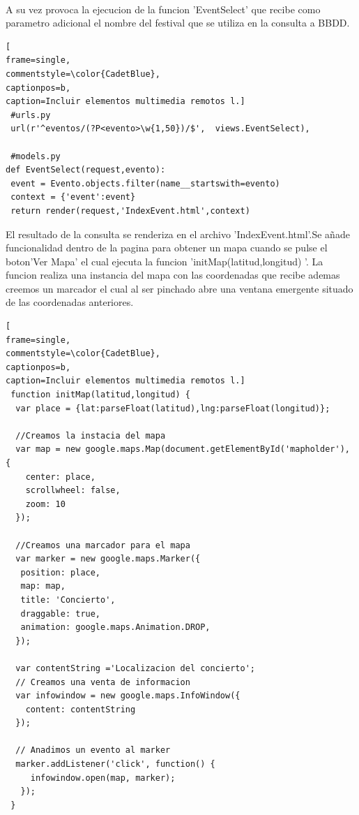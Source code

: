 \\A su vez provoca la ejecucion de la funcion 'EventSelect' que recibe como parametro adicional el nombre del festival que se utiliza en la consulta a BBDD.
\lstset{language=, breaklines=true, basicstyle=\footnotesize}
\begin{lstlisting}[
frame=single,
commentstyle=\color{CadetBlue},
captionpos=b,
caption=Incluir elementos multimedia remotos l.]
 #urls.py
 url(r'^eventos/(?P<evento>\w{1,50})/$',  views.EventSelect),
 
 #models.py
def EventSelect(request,evento):
 event = Evento.objects.filter(name__startswith=evento)
 context = {'event':event}
 return render(request,'IndexEvent.html',context)
\end{lstlisting}
El resultado de la consulta se renderiza en el archivo 'IndexEvent.html'.Se añade funcionalidad dentro de la pagina para obtener un mapa cuando se pulse el boton'Ver Mapa' el cual ejecuta la funcion 'initMap(latitud,longitud) '.
La funcion realiza una instancia del mapa con las coordenadas que recibe ademas creemos un marcador el cual al ser pinchado abre una ventana emergente situado de las coordenadas anteriores.
\begin{lstlisting}[
frame=single,
commentstyle=\color{CadetBlue},
captionpos=b,
caption=Incluir elementos multimedia remotos l.]
 function initMap(latitud,longitud) {
  var place = {lat:parseFloat(latitud),lng:parseFloat(longitud)};
  
  //Creamos la instacia del mapa
  var map = new google.maps.Map(document.getElementById('mapholder'), {
    center: place,
    scrollwheel: false,
    zoom: 10
  });
  
  //Creamos una marcador para el mapa
  var marker = new google.maps.Marker({
   position: place,
   map: map,
   title: 'Concierto',
   draggable: true,
   animation: google.maps.Animation.DROP,
  });
  
  var contentString ='Localizacion del concierto';
  // Creamos una venta de informacion
  var infowindow = new google.maps.InfoWindow({
    content: contentString
  });
  
  // Anadimos un evento al marker
  marker.addListener('click', function() {
     infowindow.open(map, marker);
   });
 }
 \end{lstlisting}
